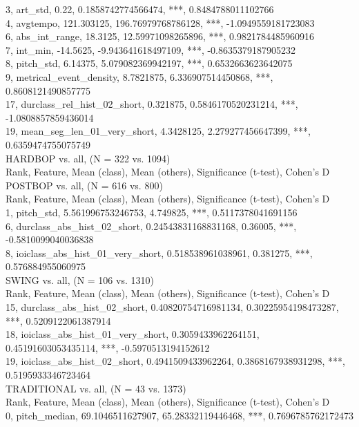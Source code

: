 3, art_std, 0.22, 0.1858742774566474, ***, 0.8484788011102766\\
4, avgtempo, 121.303125, 196.76979768786128, ***, -1.0949559181723083\\
6, abs_int_range, 18.3125, 12.59971098265896, ***, 0.9821784485960916\\
7, int_min, -14.5625, -9.943641618497109, ***, -0.8635379187905232\\
8, pitch_std, 6.14375, 5.079082369942197, ***, 0.6532663623642075\\
9, metrical_event_density, 8.7821875, 6.336907514450868, ***, 0.8608121490857775\\
17, durclass_rel_hist_02_short, 0.321875, 0.5846170520231214, ***, -1.0808857859436014\\
19, mean_seg_len_01_very_short, 4.3428125, 2.279277456647399, ***, 0.6359474755075749\\
HARDBOP vs. all, (N = 322 vs. 1094)\\
Rank, Feature, Mean (class), Mean (others), Significance (t-test), Cohen's D\\
POSTBOP vs. all, (N = 616 vs. 800)\\
Rank, Feature, Mean (class), Mean (others), Significance (t-test), Cohen's D\\
1, pitch_std, 5.561996753246753, 4.749825, ***, 0.5117378041691156\\
6, durclass_abs_hist_02_short, 0.24543831168831168, 0.36005, ***, -0.5810099040036838\\
8, ioiclass_abs_hist_01_very_short, 0.518538961038961, 0.381275, ***, 0.576884955060975\\
SWING vs. all, (N = 106 vs. 1310)\\
Rank, Feature, Mean (class), Mean (others), Significance (t-test), Cohen's D\\
15, durclass_abs_hist_02_short, 0.40820754716981134, 0.30225954198473287, ***, 0.5209122061387914\\
18, ioiclass_abs_hist_01_very_short, 0.3059433962264151, 0.45191603053435114, ***, -0.5970513194152612\\
19, ioiclass_abs_hist_02_short, 0.4941509433962264, 0.3868167938931298, ***, 0.5195933346723464\\
TRADITIONAL vs. all, (N = 43 vs. 1373)\\
Rank, Feature, Mean (class), Mean (others), Significance (t-test), Cohen's D\\
0, pitch_median, 69.1046511627907, 65.28332119446468, ***, 0.7696785762172473\\
